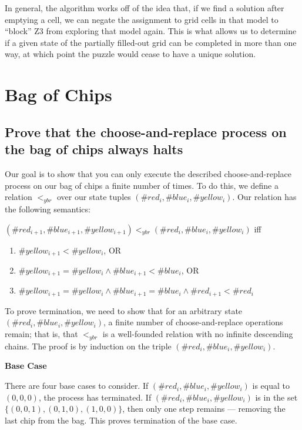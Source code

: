 \documentclass{article}
\begin{document}
In general, the algorithm works off of the idea that, if we find a solution after emptying a cell, we can negate the assignment to grid cells in that model to ``block'' Z3 from exploring that model again. This is what allows us to determine if a given state of the partially filled-out grid can be completed in more than one way, at which point the puzzle would cease to have a unique solution.

\section{Bag of Chips}

\subsection{Prove that the choose-and-replace process on the bag of chips always halts}

Our goal is to show that you can only execute the described choose-and-replace process on our bag of chips a finite number of times. To do this, we define a relation $<_{ybr}$ over our state tuples $(\#red_i, \#blue_i, \#yellow_i)$. Our relation has the following semantics:


$(\#red_{i + 1}, \#blue_{i + 1}, \#yellow_{i + 1}) <_{ybr} (\#red_i, \#blue_i, \#yellow_i)$ iff

\begin{enumerate}
  \item $\#yellow_{i + 1} < \#yellow_i$, OR
  \item $\#yellow_{i + 1} = \#yellow_i \land \#blue_{i + 1} < \#blue_i$, OR
  \item $\#yellow_{i + 1} = \#yellow_i \land \#blue_{i + 1} = \#blue_i \land \#red_{i + 1} < \#red_i$
\end{enumerate}

To prove termination, we need to show that for an arbitrary state $(\#red_i, \#blue_i, \#yellow_i)$, a finite number of choose-and-replace operations remain; that is, that $<_{ybr}$ is a well-founded relation with no infinite descending chains. The proof is by induction on the triple $(\#red_i, \#blue_i, \#yellow_i)$.

\textbf{Base Case}

There are four base cases to consider. If $(\#red_i, \#blue_i, \#yellow_i)$ is equal to $(0, 0, 0)$, the process has terminated. If $(\#red_i, \#blue_i, \#yellow_i)$ is in the set $\{(0, 0, 1), (0, 1, 0), (1, 0, 0)\}$, then only one step remains — removing the last chip from the bag. This proves termination of the base case.
\end{document}
